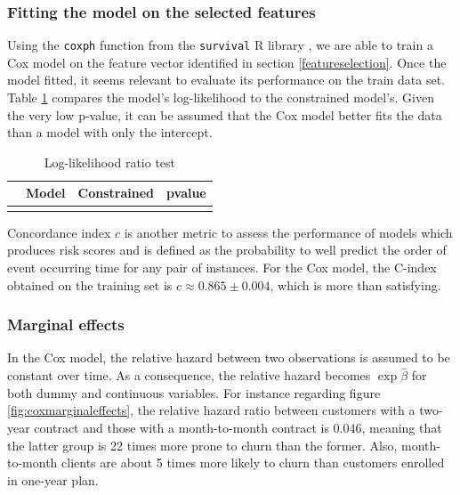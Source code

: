 \documentclass[
]{book}
\begin{document}
\hypertarget{fitting-the-model-on-the-selected-features}{%
\subsubsection*{Fitting the model on the selected features}\label{fitting-the-model-on-the-selected-features}}

Using the \texttt{coxph} function from the \texttt{survival} R library \citep{survival-book}, we are able to train a Cox model on the feature vector identified in section \ref{featureselection}. Once the model fitted, it seems relevant to evaluate its performance on the train data set. Table \ref{tab:lrtest} compares the model's log-likelihood to the constrained model's. Given the very low p-value, it can be assumed that the Cox model better fits the data than a model with only the intercept.

\begin{table}[H]

\caption{\label{tab:lrtest}Log-likelihood ratio test}
\centering
\begin{tabular}[t]{lrrr}
\toprule
  & Model & Constrained & pvalue\\
\midrule
\cellcolor{gray!6}{} & \cellcolor{gray!6}{-9228.77} & \cellcolor{gray!6}{-10448.08} & \cellcolor{gray!6}{0}\\
\bottomrule
\end{tabular}
\end{table}

Concordance index \(c\) is another metric to assess the performance of models which produces risk scores and is defined as the probability to well predict the order of event occurring time for any pair of instances. For the Cox model, the C-index obtained on the training set is \(c \approx 0.865 \pm 0.004\), which is more than satisfying.

\hypertarget{marginal-effects-1}{%
\subsubsection*{Marginal effects}\label{marginal-effects-1}}

In the Cox model, the relative hazard between two observations is assumed to be constant over time. As a consequence, the relative hazard becomes \(\exp \hat{\beta}\) for both dummy and continuous variables. For instance regarding figure \ref{fig:coxmarginaleffects}, the relative hazard ratio between customers with a two-year contract and those with a month-to-month contract is 0.046, meaning that the latter group is 22 times more prone to churn than the former. Also, month-to-month clients are about 5 times more likely to churn than customers enrolled in one-year plan.
\end{document}
